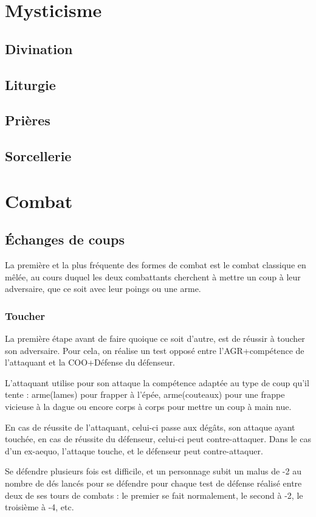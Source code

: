 \documentclass[10pt,a4paper,twocolumn]{book}
\begin{document}
\chapter{Mysticisme}
\section{Divination}
\section{Liturgie}
\section{Prières}
\section{Sorcellerie}

\chapter{Combat}
\section{Échanges de coups}
La première et la plus fréquente des formes de combat est le combat classique en mêlée, au cours duquel les deux combattants cherchent à mettre un coup à leur adversaire, que ce soit avec leur poings ou une arme.
\subsection{Toucher}
La première étape avant de faire quoique ce soit d'autre, est de réussir à toucher son adversaire. Pour cela, on réalise un test opposé entre l'AGR+compétence de l'attaquant et la COO+Défense du défenseur.

L'attaquant utilise pour son attaque la compétence adaptée au type de coup qu'il tente : arme(lames) pour frapper à l'épée, arme(couteaux) pour une frappe vicieuse à la dague ou encore corps à corps pour mettre un coup à main nue.

En cas de réussite de l'attaquant, celui-ci passe aux dégâts, son attaque ayant touchée, en cas de réussite du défenseur, celui-ci peut contre-attaquer. Dans le cas d'un ex-aequo, l'attaque touche, et le défenseur peut contre-attaquer.

Se défendre plusieurs fois est difficile, et un personnage subit un malus de -2 au nombre de dés lancés pour se défendre pour chaque test de défense réalisé entre deux de ses tours de combats : le premier se fait normalement, le second à -2, le troisième à -4, etc.
\end{document}
